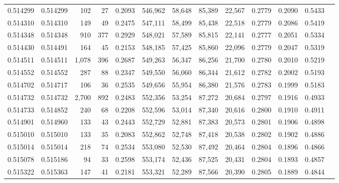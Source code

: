 \begin{tabular}{rrrrrrrrrrrrr}
0.514299 & 0.514299 &   102 &    27 &                                     0.2093 & 546,962 &  58,648 &  85,389 &  22,567 & 0.2779 & 0.2090 & 0.5433 \\
0.514310 & 0.514310 &   149 &    49 &                                     0.2475 & 547,111 &  58,499 &  85,438 &  22,518 & 0.2779 & 0.2086 & 0.5419 \\
0.514348 & 0.514348 &   910 &   377 &                                     0.2929 & 548,021 &  57,589 &  85,815 &  22,141 & 0.2777 & 0.2051 & 0.5334 \\
0.514430 & 0.514491 &   164 &    45 &                                     0.2153 & 548,185 &  57,425 &  85,860 &  22,096 & 0.2779 & 0.2047 & 0.5319 \\
0.514511 & 0.514511 & 1,078 &   396 &                                     0.2687 & 549,263 &  56,347 &  86,256 &  21,700 & 0.2780 & 0.2010 & 0.5219 \\
0.514552 & 0.514552 &   287 &    88 &                                     0.2347 & 549,550 &  56,060 &  86,344 &  21,612 & 0.2782 & 0.2002 & 0.5193 \\
0.514702 & 0.514717 &   106 &    36 &                                     0.2535 & 549,656 &  55,954 &  86,380 &  21,576 & 0.2783 & 0.1999 & 0.5183 \\
0.514732 & 0.514732 & 2,700 &   892 &                                     0.2483 & 552,356 &  53,254 &  87,272 &  20,684 & 0.2797 & 0.1916 & 0.4933 \\
0.514733 & 0.514852 &   240 &    68 &                                     0.2208 & 552,596 &  53,014 &  87,340 &  20,616 & 0.2800 & 0.1910 & 0.4911 \\
0.514901 & 0.514960 &   133 &    43 &                                     0.2443 & 552,729 &  52,881 &  87,383 &  20,573 & 0.2801 & 0.1906 & 0.4898 \\
0.515010 & 0.515010 &   133 &    35 &                                     0.2083 & 552,862 &  52,748 &  87,418 &  20,538 & 0.2802 & 0.1902 & 0.4886 \\
0.515014 & 0.515014 &   218 &    74 &                                     0.2534 & 553,080 &  52,530 &  87,492 &  20,464 & 0.2804 & 0.1896 & 0.4866 \\
0.515078 & 0.515186 &    94 &    33 &                                     0.2598 & 553,174 &  52,436 &  87,525 &  20,431 & 0.2804 & 0.1893 & 0.4857 \\
0.515322 & 0.515363 &   147 &    41 &                                     0.2181 & 553,321 &  52,289 &  87,566 &  20,390 & 0.2805 & 0.1889 & 0.4844 \\

\end{tabular}
